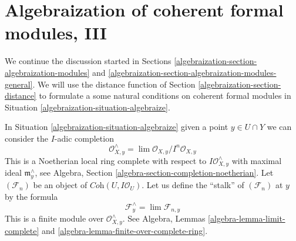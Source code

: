 \section{Algebraization of coherent formal modules, III}
\label{algebraization-section-uniqueness}
We continue the discussion started in Sections
\ref{algebraization-section-algebraization-modules} and
\ref{algebraization-section-algebraization-modules-general}.
We will use the distance function of Section \ref{algebraization-section-distance}
to formulate a some natural conditions on
coherent formal modules in Situation \ref{algebraization-situation-algebraize}.

\medskip\noindent
In Situation \ref{algebraization-situation-algebraize} given a point $y \in U \cap Y$
we can consider the $I$-adic completion
$$
\mathcal{O}_{X, y}^\wedge = \lim \mathcal{O}_{X, y}/I^n\mathcal{O}_{X, y}
$$
This is a Noetherian local ring complete with respect to
$I\mathcal{O}_{X, y}^\wedge$ with maximal ideal $\mathfrak m_y^\wedge$, see
Algebra, Section \ref{algebra-section-completion-noetherian}.
Let $(\mathcal{F}_n)$ be an object of $\textit{Coh}(U, I\mathcal{O}_U)$.
Let us define the ``stalk'' of $(\mathcal{F}_n)$ at $y$ by the formula
$$
\mathcal{F}_y^\wedge = \lim \mathcal{F}_{n, y}
$$
This is a finite module over $\mathcal{O}_{X, y}^\wedge$. See
Algebra, Lemmas \ref{algebra-lemma-limit-complete} and
\ref{algebra-lemma-finite-over-complete-ring}.


